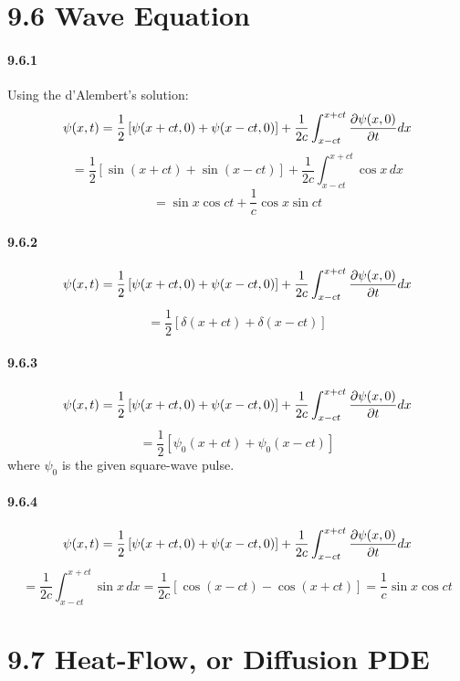 \documentclass[a4paper]{article}
\begin{document}
\section*{9.6 Wave Equation }

\paragraph{9.6.1}
Using the d’Alembert’s solution:
\[
\psi(x,t)=\frac{1}{2}\left[\psi(x+ct,0)+\psi(x-ct,0)\right]+\frac{1}{2c}\int_{x-ct}^{x+ct}\frac{\partial\psi(x,0)}{\partial t}dx
\]
\[
=\frac{1}{2}\left[\sin(x+ct)+\sin(x-ct)\right]+\frac{1}{2c}\int_{x-ct}^{x+ct}\cos x\,dx
\]
\[
=\sin x\cos ct+\frac{1}{c}\cos x\sin ct
\]

\paragraph{9.6.2}
\[
\psi(x,t)=\frac{1}{2}\left[\psi(x+ct,0)+\psi(x-ct,0)\right]+\frac{1}{2c}\int_{x-ct}^{x+ct}\frac{\partial\psi(x,0)}{\partial t}dx
\]
\[
=\frac{1}{2}\left[\delta(x+ct)+\delta(x-ct)\right]
\]

\paragraph{9.6.3}
\[
\psi(x,t)=\frac{1}{2}\left[\psi(x+ct,0)+\psi(x-ct,0)\right]+\frac{1}{2c}\int_{x-ct}^{x+ct}\frac{\partial\psi(x,0)}{\partial t}dx
\]
\[
=\frac{1}{2}\left[\psi_0(x+ct)+\psi_0(x-ct)\right]
\]
where $\psi_0$ is the given square-wave pulse.

\paragraph{9.6.4}
\[
\psi(x,t)=\frac{1}{2}\left[\psi(x+ct,0)+\psi(x-ct,0)\right]+\frac{1}{2c}\int_{x-ct}^{x+ct}\frac{\partial\psi(x,0)}{\partial t}dx
\]
\[
=\frac{1}{2c}\int_{x-ct}^{x+ct}\sin x\,dx
=\frac{1}{2c}\left[\cos(x-ct)-\cos(x+ct) \right]
=\frac{1}{c}\sin x\cos ct
\]

\section*{9.7 Heat-Flow, or Diffusion PDE}
\end{document}
